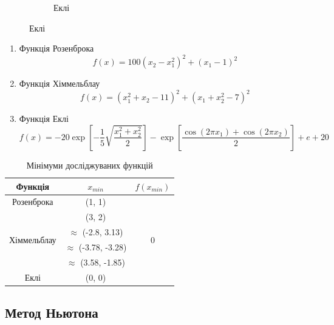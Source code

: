 \begin{figure}[h!]
\begin{subfigure}{0.3 \textwidth}
        \caption{Еклі}
    \end{subfigure}
\end{figure}

\begin{enumerate}
    \item Функція Розенброка
    $$ f(x) = 100(x_2-x_1^2)^2 + (x_1-1)^2 $$
    \item Функція Хіммельблау
    $$ f(x) = (x_1^2 + x_2 - 11)^2 + (x_1 + x_2^2 - 7)^2 $$
    \item Функція Еклі
    $$ f(x) = -20 \exp{\left[-\frac{1}{5} \sqrt{\frac{x_1^2 + x_2^2}{2}}\right]} -
    \exp{\left[\frac{\cos(2 \pi x_1) + \cos(2 \pi x_2)}{2}\right]} + e + 20 $$
\end{enumerate}

\begin{table}[h!]
    \centering
    \begin{tabular}{|c|c|c|}
        \hline
        Функція & $x_{min}$ & $f(x_{min})$ \\
        \hline
        Розенброка & (1, 1) &
        \multirow{6}{*}{0} \\ \cline{1-2}

        \multirow{4}{*}{Хіммельблау} &
        (3, 2) & \\ \cline{2-2}
        & $\approx$ (-2.8, 3.13) &  \\ \cline{2-2}
        & $\approx$ (-3.78, -3.28) &  \\ \cline{2-2}
        & $\approx$ (3.58, -1.85) &  \\ \cline{1-2}

        Еклі & (0, 0) & \\
        \hline
    \end{tabular}
    \caption{Мінімуми досліджуваних функцій}
\end{table}


\pagebreak
\subsection*{Метод Ньютона}


